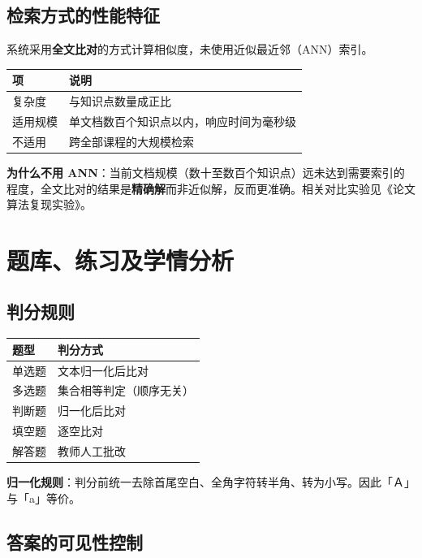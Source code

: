 \documentclass[UTF8,a4paper,11pt]{ctexrep}
\begin{document}
\subsection{检索方式的性能特征}

系统采用\textbf{全文比对}的方式计算相似度，未使用近似最近邻（ANN）索引。

\begin{center}
\small
\begin{tabularx}{\linewidth}{@{}XX@{}}
\toprule
项 & 说明 \\
\midrule
复杂度 & 与知识点数量成正比 \\
适用规模 & 单文档数百个知识点以内，响应时间为毫秒级 \\
不适用 & 跨全部课程的大规模检索 \\
\bottomrule
\end{tabularx}
\end{center}
\textbf{为什么不用 ANN}：当前文档规模（数十至数百个知识点）远未达到需要索引的程度，全文比对的结果是\textbf{精确解}而非近似解，反而更准确。相关对比实验见《论文算法复现实验》。


\section{题库、练习及学情分析}


\subsection{判分规则}

\begin{center}
\small
\begin{tabularx}{\linewidth}{@{}XX@{}}
\toprule
题型 & 判分方式 \\
\midrule
单选题 & 文本归一化后比对 \\
多选题 & 集合相等判定（顺序无关） \\
判断题 & 归一化后比对 \\
填空题 & 逐空比对 \\
解答题 & 教师人工批改 \\
\bottomrule
\end{tabularx}
\end{center}
\textbf{归一化规则}：判分前统一去除首尾空白、全角字符转半角、转为小写。因此「Ａ」与「a」等价。


\subsection{答案的可见性控制}
\end{document}

